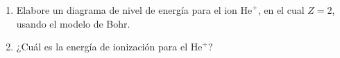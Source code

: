 \item \begin{enumerate}
    \item Elabore un diagrama de nivel de energía para el ion $\text{He}^+$, en el cual $Z = 2$, usando el modelo de Bohr.
    \item ¿Cuál es la energía de ionización para el $\text{He}^+$?
\end{enumerate}